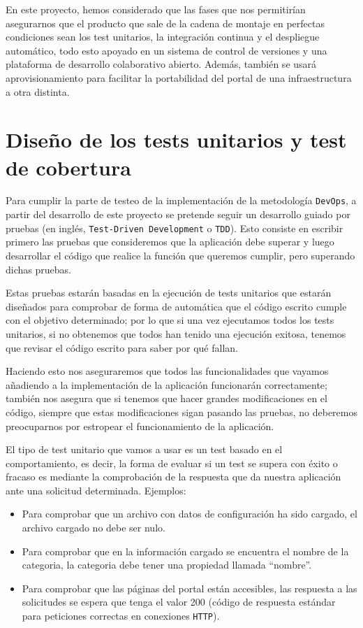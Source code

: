 \bigskip
En este proyecto, hemos considerado que las fases que nos permitirían asegurarnos que el producto que sale de la cadena de 
montaje en perfectas condiciones sean los test unitarios, la integración continua y el despliegue automático, todo esto apoyado
en un sistema de control de versiones y una plataforma de desarrollo colaborativo abierto. Además, también se usará
aprovisionamiento para facilitar la portabilidad del portal de una infraestructura a otra distinta. 

\section{Diseño de los tests unitarios y test de cobertura}

Para cumplir la parte de testeo de la implementación de la metodología {\tt DevOps}, a partir del desarrollo de este proyecto se 
pretende seguir un desarrollo guiado por pruebas (en inglés, {\tt Test-Driven Development} o {\tt TDD}). Esto consiste en
escribir primero las pruebas que consideremos que la aplicación debe superar y luego desarrollar el código que realice la 
función que queremos cumplir, pero superando dichas pruebas. 

\bigskip
Estas pruebas estarán basadas en la ejecución de tests unitarios que estarán diseñados para comprobar de forma de automática
que el código escrito cumple con el objetivo determinado; por lo que si una vez ejecutamos todos los tests unitarios, si no
obtenemos que todos han tenido una ejecución exitosa, tenemos que revisar el código escrito para saber por qué fallan.

\bigskip
Haciendo esto nos aseguraremos que todos las funcionalidades que vayamos añadiendo a la implementación de la aplicación
funcionarán correctamente; también nos asegura que si tenemos que hacer grandes modificaciones en el código, siempre que estas
modificaciones sigan pasando las pruebas, no deberemos preocuparnos por estropear el funcionamiento de la aplicación.

\bigskip
El tipo de test unitario que vamos a usar es un test basado en el comportamiento, es decir, la forma de evaluar si un test
se supera con éxito o fracaso es mediante la comprobación de la respuesta que da nuestra aplicación ante una solicitud 
determinada. Ejemplos:

\begin{itemize}
 \item Para comprobar que un archivo con datos de configuración ha sido cargado, el archivo cargado no debe ser nulo.
 \item Para comprobar que en la información cargado se encuentra el nombre de la categoria, la categoria debe tener una 
 propiedad llamada ``nombre''.
 \item Para comprobar que las páginas del portal están accesibles, las respuesta a las solicitudes se espera que tenga el valor
 200 (código de respuesta estándar para peticiones correctas en conexiones {\tt HTTP}).
\end{itemize}

